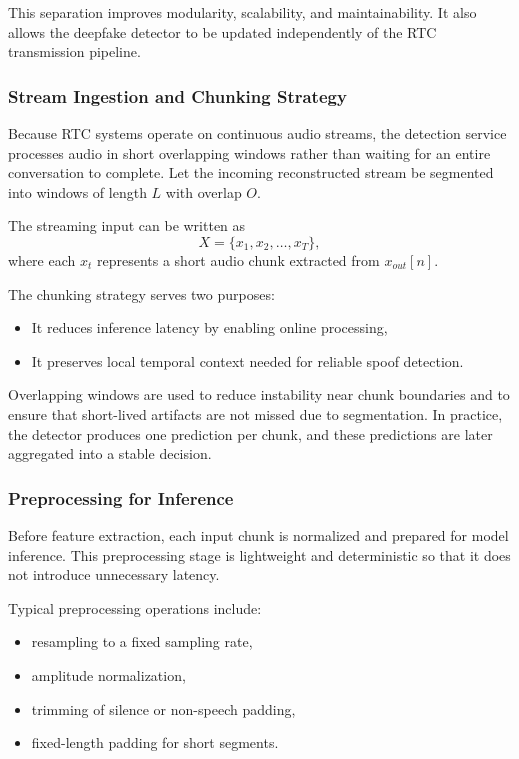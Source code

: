 This separation improves modularity, scalability, and maintainability. It also allows the deepfake detector to be updated independently of the RTC transmission pipeline.

\subsubsection{Stream Ingestion and Chunking Strategy}

Because RTC systems operate on continuous audio streams, the detection service processes audio in short overlapping windows rather than waiting for an entire conversation to complete. Let the incoming reconstructed stream be segmented into windows of length \(L\) with overlap \(O\).

The streaming input can be written as
\begin{equation}
X = \{x_1, x_2, \ldots, x_T\},
\end{equation}
where each \(x_t\) represents a short audio chunk extracted from \(x_{out}[n]\).

The chunking strategy serves two purposes:
\begin{itemize}
    \item It reduces inference latency by enabling online processing,
    \item It preserves local temporal context needed for reliable spoof detection.
\end{itemize}

Overlapping windows are used to reduce instability near chunk boundaries and to ensure that short-lived artifacts are not missed due to segmentation. In practice, the detector produces one prediction per chunk, and these predictions are later aggregated into a stable decision.

\subsubsection{Preprocessing for Inference}

Before feature extraction, each input chunk is normalized and prepared for model inference. This preprocessing stage is lightweight and deterministic so that it does not introduce unnecessary latency.

Typical preprocessing operations include:
\begin{itemize}
    \item resampling to a fixed sampling rate,
    \item amplitude normalization,
    \item trimming of silence or non-speech padding,
    \item fixed-length padding for short segments.
\end{itemize}

